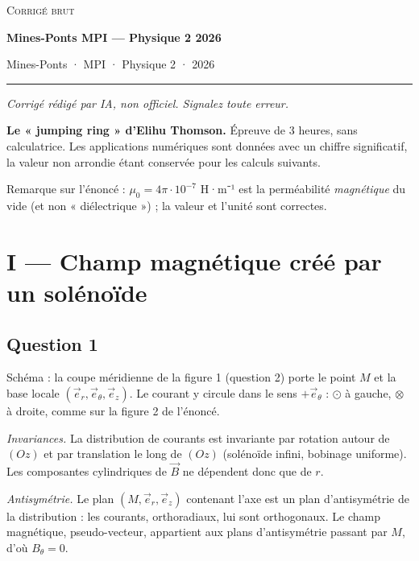 \documentclass[11pt,a4paper]{article}
\begin{document}
\thispagestyle{plain}
\begin{center}
  {\small\scshape Corrigé brut}\par\smallskip
  {\LARGE\bfseries Mines-Ponts MPI — Physique 2 2026\par}\medskip
  {\large Mines-Ponts · MPI · Physique 2 · 2026\par}
\end{center}
\vspace{2pt}\hrule\vspace{8pt}

\emph{Corrigé rédigé par IA, non officiel. Signalez toute erreur.}

\textbf{Le « jumping ring » d'Elihu Thomson.} Épreuve de 3 heures, sans calculatrice. Les applications numériques sont données avec un chiffre significatif, la valeur non arrondie étant conservée pour les calculs suivants.

Remarque sur l'énoncé : \(\mu_0=4\pi\cdot10^{-7}\) H·m⁻¹ est la perméabilité \emph{magnétique} du vide (et non « diélectrique ») ; la valeur et l'unité sont correctes.

\hypertarget{i-champ-magnuxe9tique-cruxe9uxe9-par-un-soluxe9nouxefde}{%
\section{I --- Champ magnétique créé par un solénoïde}\label{i-champ-magnuxe9tique-cruxe9uxe9-par-un-soluxe9nouxefde}}

\hypertarget{question-1}{%
\subsection{Question 1}\label{question-1}}

Schéma : la coupe méridienne de la figure 1 (question 2) porte le point \(M\) et la base locale \((\vec e_r,\vec e_\theta,\vec e_z)\).
Le courant y circule dans le sens \(+\vec e_\theta\) : \(\odot\) à gauche, \(\otimes\) à droite, comme sur la figure 2 de l'énoncé.

\emph{Invariances.} La distribution de courants est invariante par rotation autour de \((Oz)\) et par translation le long de \((Oz)\) (solénoïde infini, bobinage uniforme). Les composantes cylindriques de \(\vec B\) ne dépendent donc que de \(r\).

\emph{Antisymétrie.} Le plan \((M,\vec e_r,\vec e_z)\) contenant l'axe est un plan d'antisymétrie de la distribution : les courants, orthoradiaux, lui sont orthogonaux. Le champ magnétique, pseudo-vecteur, appartient aux plans d'antisymétrie passant par \(M\), d'où \(B_\theta=0\).
\end{document}
